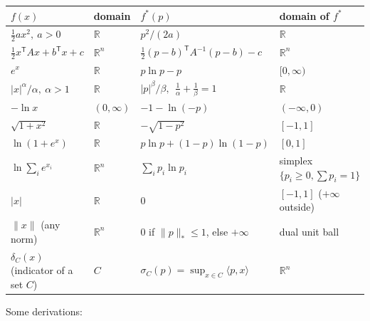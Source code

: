\documentclass[11pt,a4paper]{article}
\newcommand{\R}{\mathbb{R}}
\newcommand{\ip}[2]{\langle #1,#2\rangle}
\theoremstyle{plain}
\theoremstyle{definition}
\theoremstyle{remark}
\begin{document}
\begin{center}
\begin{tabular}{@{}llll@{}}
\toprule
$f(x)$ & domain & $f^*(p)$ & domain of $f^*$\\
\midrule
$\tfrac12ax^2,\ a>0$ & $\R$ & $p^2/(2a)$ & $\R$\\[2pt]
$\tfrac12x^{\mathsf T}Ax+b^{\mathsf T}x+c$ & $\R^n$ & $\tfrac12(p-b)^{\mathsf T}A^{-1}(p-b)-c$ & $\R^n$\\[2pt]
$e^x$ & $\R$ & $p\ln p-p$ & $[0,\infty)$\\[2pt]
$|x|^\alpha/\alpha,\ \alpha>1$ & $\R$ & $|p|^\beta/\beta,\ \ \tfrac1\alpha+\tfrac1\beta=1$ & $\R$\\[2pt]
$-\ln x$ & $(0,\infty)$ & $-1-\ln(-p)$ & $(-\infty,0)$\\[2pt]
$\sqrt{1+x^2}$ & $\R$ & $-\sqrt{1-p^2}$ & $[-1,1]$\\[2pt]
$\ln(1+e^x)$ & $\R$ & $p\ln p+(1-p)\ln(1-p)$ & $[0,1]$\\[2pt]
$\ln\sum_ie^{x_i}$ & $\R^n$ & $\sum_ip_i\ln p_i$ & simplex $\{p_i\ge0,\sum p_i=1\}$\\[2pt]
$|x|$ & $\R$ & $0$ & $[-1,1]$ ($+\infty$ outside)\\[2pt]
$\|x\|$ (any norm) & $\R^n$ & $0$ if $\|p\|_*\le1$, else $+\infty$ & dual unit ball\\[2pt]
$\delta_C(x)$ (indicator of a set $C$) & $C$ & $\sigma_C(p)=\sup_{x\in C}\ip{p}{x}$ & $\R^n$\\
\bottomrule
\end{tabular}
\end{center}

Some derivations:
\end{document}
